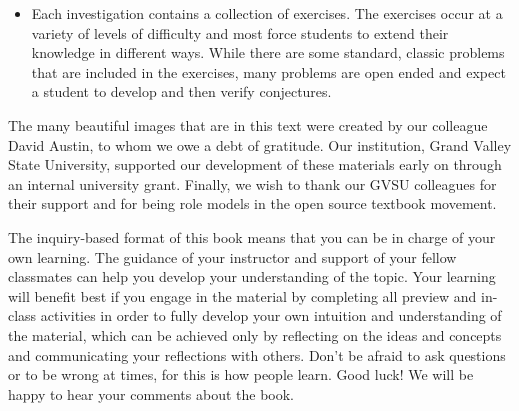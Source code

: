 \begin{itemize}
\item Each investigation contains a collection of exercises. The exercises occur at a variety of levels of difficulty and most force students to extend their knowledge in different ways. While there are some standard, classic problems that are included in the exercises, many problems are open ended and expect a student to develop and then verify conjectures.
\end{itemize}


The many beautiful images that are in this text were created by our colleague David Austin, to whom we owe a debt of gratitude. Our institution, Grand Valley State University, supported our development of these materials early on through an internal university grant. Finally, we wish to thank our GVSU colleagues for their support and for being role models in the open source textbook movement. 


The inquiry-based format of this book means that you can be in charge of your own learning. The guidance of your instructor and support of your fellow classmates can help you develop your understanding of the topic. Your learning will benefit best if you engage in the material by completing all preview and in-class activities in order to fully develop your own intuition and understanding of the material, which can be achieved only by reflecting on the ideas and concepts and communicating your reflections with others. Don't be afraid to ask questions or to be wrong at times, for this is how people learn. Good luck! We will be happy to hear your comments about the book.



